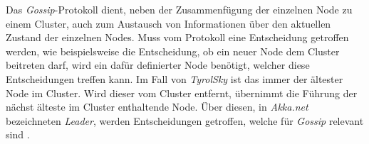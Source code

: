 Das \textit{Gossip}-Protokoll dient, neben der Zusammenfügung der einzelnen Node zu einem Cluster, auch zum Austausch von Informationen über den aktuellen Zustand der einzelnen Nodes. Muss vom Protokoll eine Entscheidung getroffen werden, wie beispielsweise die Entscheidung,  ob ein neuer Node dem Cluster beitreten darf, wird ein dafür definierter Node benötigt, welcher diese Entscheidungen treffen kann. Im Fall von \textit{TyrolSky} ist das immer der ältester Node im Cluster. Wird dieser vom Cluster entfernt, übernimmt die Führung der nächst älteste im Cluster enthaltende Node. Über diesen, in \textit{Akka.net} bezeichneten \textit{Leader}, werden Entscheidungen getroffen, welche für \textit{Gossip} relevant sind \citep{akkaInAction}.  
% 
% 

